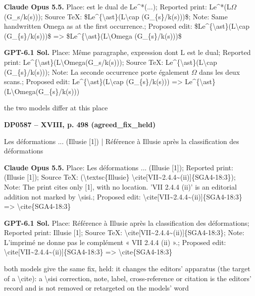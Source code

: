 \textbf{Claude Opus 5.5.} Place: est le dual de Le\textasciicircum{}*(...); Reported print: Le\textasciicircum{}*(L\ensuremath{\Omega}(G\_s/k(s))); Source TeX: \$Le\textasciicircum{}\{\textbackslash{}ast\}(L\textbackslash{}cap (G\_\{s\}/k(s)))\$; Note: Same handwritten Omega as at the first occurrence.; Proposed edit: \$Le\textasciicircum{}\{\textbackslash{}ast\}(L\textbackslash{}cap (G\_\{s\}/k(s)))\$ =\allowbreak > \$Le\textasciicircum{}\{\textbackslash{}ast\}(L\textbackslash{}Omega (G\_\{s\}/k(s)))\$\par
\textbf{GPT-6.1 Sol.} Place: Même paragraphe, expression dont L est le dual; Reported print: Le\textasciicircum{}\{\textbackslash{}ast\}(L\textbackslash{}Omega(G\_s/k(s))); Source TeX: Le\textasciicircum{}\{\textbackslash{}ast\}(L\textbackslash{}cap (G\_\{s\}/k(s))); Note: La seconde occurrence porte également \ensuremath{\Omega} dans les deux scans.; Proposed edit: Le\textasciicircum{}\{\textbackslash{}ast\}(L\textbackslash{}cap (G\_\{s\}/k(s))) =\allowbreak > Le\textasciicircum{}\{\textbackslash{}ast\}(L\textbackslash{}Omega(G\_\{s\}/k(s)))\par
the two models differ at this place\par
\par\noindent\hypertarget{DP0587}{}\textbf{DP0587 -- XVIII, p. 498 (agreed\_fix\_held)}\par
Les déformations ... (Illusie [1]) | Référence à Illusie après la classification des déformations\par
\textbf{Claude Opus 5.5.} Place: Les déformations ... (Illusie [1]); Reported print: (Illusie [1]); Source TeX: (\textbackslash{}textsc\{Illusie\} \textbackslash{}cite[VII\textasciitilde{}2.4.4\textasciitilde{}(ii)]\{SGA4-18:3\}); Note: The print cites only [1], with no location. 'VII 2.4.4 (ii)' is an editorial addition not marked by \textbackslash{}sisi.; Proposed edit: \textbackslash{}cite[VII\textasciitilde{}2.4.4\textasciitilde{}(ii)]\{SGA4-18:3\} =\allowbreak > \textbackslash{}cite\{SGA4-18:3\}\par
\textbf{GPT-6.1 Sol.} Place: Référence à Illusie après la classification des déformations; Reported print: Illusie [1]; Source TeX: \textbackslash{}cite[VII\textasciitilde{}2.4.4\textasciitilde{}(ii)]\{SGA4-18:3\}; Note: L'imprimé ne donne pas le complément « VII 2.4.4 (ii) ».; Proposed edit: \textbackslash{}cite[VII\textasciitilde{}2.4.4\textasciitilde{}(ii)]\{SGA4-18:3\} =\allowbreak > \textbackslash{}cite\{SGA4-18:3\}\par
both models give the same fix, held: it changes the editors' apparatus (the target of a \textbackslash{}cite): a \textbackslash{}sisi correction, note, label, cross-reference or citation is the editors' record and is not removed or retargeted on the models' word\par
